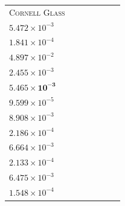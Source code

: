 \begin{table}[p]
{\begin{tabular}{lcccccc}
\textsc{Cornell Glass} & \shortstack{$5.445\!\times\!10^{-3}$\\$5.472\!\times\!10^{-3}$\\$1.841\!\times\!10^{-4}$} & \shortstack{$4.974\!\times\!10^{-2}$\\$4.897\!\times\!10^{-2}$\\$2.455\!\times\!10^{-3}$} & \shortstack{$\mathbf{5.435\!\times\!10^{-3}}$\\$\mathbf{5.465\!\times\!10^{-3}}$\\$9.599\!\times\!10^{-5}$} & \shortstack{$8.887\!\times\!10^{-3}$\\$8.908\!\times\!10^{-3}$\\$2.186\!\times\!10^{-4}$} & \shortstack{$6.675\!\times\!10^{-3}$\\$6.664\!\times\!10^{-3}$\\$2.133\!\times\!10^{-4}$} & \shortstack{$6.491\!\times\!10^{-3}$\\$6.475\!\times\!10^{-3}$\\$1.548\!\times\!10^{-4}$} \\
\bottomrule
\end{tabular}%
}
\end{table}
